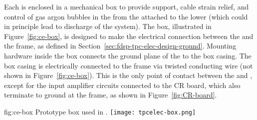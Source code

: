 Each  is enclosed in a mechanical  box to provide support, cable strain
relief, and control of gas argon bubbles in the \lar from the  attached to the lower 
(which could in principle lead to discharge of the  system).
The  box, illustrated in Figure~\ref{fig:ce-box}, is designed to make the electrical connection 
between the  and the  frame, as defined in Section~\ref{sec:fdsp-tpc-elec-design-ground}.
Mounting hardware inside the  box connects the ground plane of the  to the box casing. The
box casing is electrically connected to the  frame via twisted conducting wire (not 
shown in Figure~\ref{fig:ce-box}). This is the only point of contact between the  and
, except for the input amplifier circuits connected to the CR board, which also terminate to
ground at the  frame, as shown in Figure~\ref{fig:CR-board}.

\begin{dunefigure}
{fig:ce-box}
{Prototype  box used in .}
\texttt{[image: tpcelec-box.png]}
\end{dunefigure}

